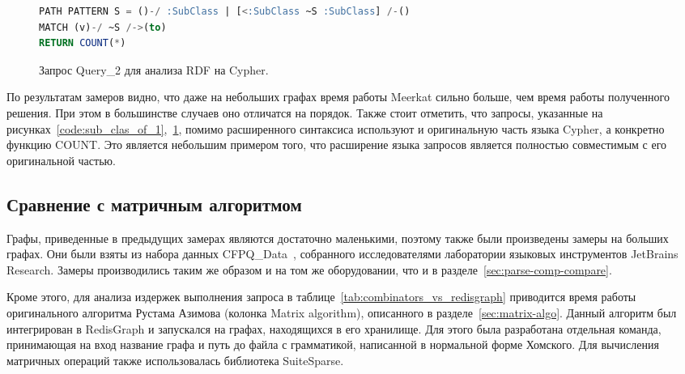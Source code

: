 \begin{figure}[h!]
\begin{adjustbox}{max width=\textwidth}
\begin{lstlisting}[language=sql]
PATH PATTERN S = ()-/ :SubClass | [<:SubClass ~S :SubClass] /-()
MATCH (v)-/ ~S /->(to)
RETURN COUNT(*)
\end{lstlisting}
\end{adjustbox}
\caption{Запрос Query\_2 для анализа RDF на Cypher.}
\label{code:sub_clas_of_2}
\end{figure}

По результатам замеров видно, что даже на небольших графах время работы Meerkat сильно больше, чем время работы полученного решения. При этом в большинстве случаев оно отличатся на порядок. Также стоит отметить, что запросы, указанные на рисунках~\ref{code:sub_clas_of_1},~\ref{code:sub_clas_of_2}, помимо расширенного синтаксиса используют и оригинальную часть языка Cyp\-her, а конкретно функцию COUNT. Это является небольшим примером того, что расширение языка запросов является полностью совместимым с его оригинальной частью.


\subsection{Сравнение с матричным алгоритмом}
Графы, приведенные в предыдущих замерах являются достаточно маленькими, поэтому также были произведены замеры на больших графах. Они были взяты из набора данных CFPQ\_Data~\cite{cfpq-data}, собранного исследователями лаборатории языковых инструментов JetBrains Research. Замеры производились таким же образом и на том же оборудовании, что и в разделе~\ref{sec:parse-comp-compare}.


Кроме этого, для анализа издержек выполнения запроса в таблице~\ref{tab:combinators_vs_redisgraph} приводится время работы оригинального алгоритма Рустама Азимова (колонка Matrix algorithm), описанного в разделе~\ref{sec:matrix-algo}. Данный алгоритм был интегрирован в RedisGraph и запускался на графах, находящихся в его хранилище. Для этого была разработана отдельная команда, принимающая на вход название графа и путь до файла с грамматикой, написанной в нормальной форме Хомского. Для вычисления матричных операций также использовалась библиотека SuiteSparse.

